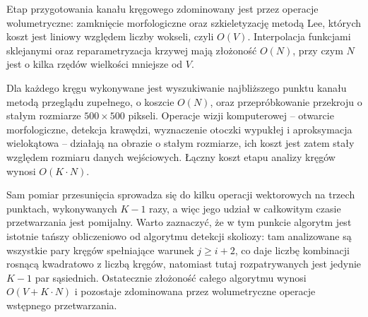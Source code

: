 Etap przygotowania kanału kręgowego zdominowany jest przez operacje wolumetryczne: zamknięcie morfologiczne oraz szkieletyzację metodą Lee, których koszt jest liniowy względem liczby wokseli, czyli $O(V)$.
Interpolacja funkcjami sklejanymi oraz reparametryzacja krzywej mają złożoność $O(N)$, przy czym $N$ jest o kilka rzędów wielkości mniejsze od $V$.

Dla każdego kręgu wykonywane jest wyszukiwanie najbliższego punktu kanału metodą przeglądu zupełnego, o koszcie $O(N)$, oraz przepróbkowanie przekroju o stałym rozmiarze $500 \times 500$ pikseli.
Operacje wizji komputerowej -- otwarcie morfologiczne, detekcja krawędzi, wyznaczenie otoczki wypukłej i aproksymacja wielokątowa -- działają na obrazie o stałym rozmiarze, ich koszt jest zatem stały względem rozmiaru danych wejściowych.
Łączny koszt etapu analizy kręgów wynosi $O(K \cdot N)$.

Sam pomiar przesunięcia sprowadza się do kilku operacji wektorowych na trzech punktach, wykonywanych $K-1$ razy, a więc jego udział w całkowitym czasie przetwarzania jest pomijalny.
Warto zaznaczyć, że w tym punkcie algorytm jest istotnie tańszy obliczeniowo od algorytmu detekcji skoliozy: tam analizowane są wszystkie pary kręgów spełniające warunek $j \geq i+2$, co daje liczbę kombinacji rosnącą kwadratowo z liczbą kręgów, natomiast tutaj rozpatrywanych jest jedynie $K-1$ par sąsiednich.
Ostatecznie złożoność całego algorytmu wynosi $O(V + K \cdot N)$ i pozostaje zdominowana przez wolumetryczne operacje wstępnego przetwarzania.
